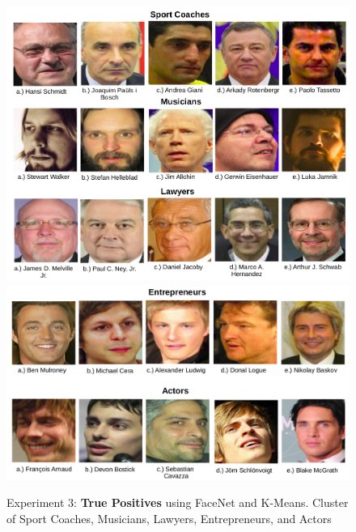 \documentclass[12pt,english]{article}
\begin{document}
\begin{figure}[H]
 \centering
    \includegraphics[width=\columnwidth]{figures/lawyers.png}
    \includegraphics[width=\columnwidth]{figures/actor.png}
    \caption{Experiment 3: \textbf{True Positives} using FaceNet and K-Means. Cluster of Sport Coaches, Musicians, Lawyers, Entrepreneurs, and Actors}
    \label{fig:ex2tp}
\end{figure}
\end{document}
